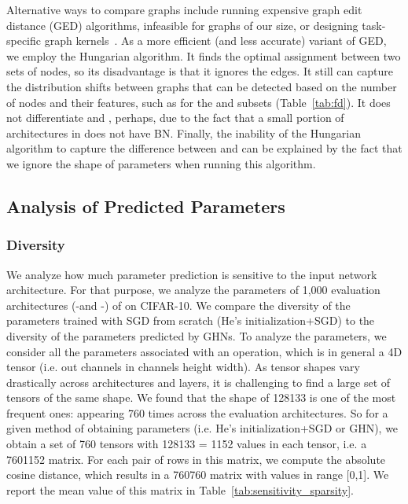 Alternative ways to compare graphs include running expensive graph edit distance (GED) algorithms, infeasible for graphs of our size, or designing task-specific graph kernels~\cite{kriege2020survey,yanardag2015deep,jin2019auto,ma2021deep}. As a more efficient (and less accurate) variant of GED, we employ the Hungarian algorithm. It finds the optimal assignment between two sets of nodes, so its disadvantage is that it ignores the edges. It still can capture the distribution shifts between graphs that can be detected based on the number of nodes and their features, such as for the \deep and \dense subsets (Table~\ref{tab:fd}). It does not differentiate \iidtrain and \bnfree, perhaps, due to the fact that a small portion of architectures in \iidtrain does not have BN. Finally, the inability of the Hungarian algorithm to capture the difference between \iidtrain and \wide can be explained by the fact that we ignore the shape of parameters when running this algorithm.



\subsection{Analysis of Predicted Parameters}

\subsubsection{Diversity}

We analyze how much parameter prediction is sensitive to the input network architecture. For that purpose, we analyze the parameters of 1,000 evaluation architectures (\iid-\iidval and \iid-\iidtest) of \dataset on CIFAR-10. We compare the diversity of the parameters trained with SGD from scratch (He’s initialization+SGD) to the diversity of the parameters predicted by GHNs. To analyze the parameters, we consider all the parameters associated with an operation, which is in general a 4D tensor (i.e. out channels  in channels  height  width). As tensor shapes vary drastically across architectures and layers, it is challenging to find a large set of tensors of the same shape. We found that the shape of 128133 is one of the most frequent ones: appearing 760 times across the evaluation architectures. So for a given method of obtaining parameters (i.e. He’s initialization+SGD or GHN), we obtain a set of 760 tensors with 128133 = 1152 values in each tensor, i.e. a 7601152 matrix. For each pair of rows in this matrix, we compute the absolute cosine distance, which results in a 760760 matrix with values in range [0,1]. We report the mean value of this matrix in Table~\ref{tab:sensitivity_sparsity}.

